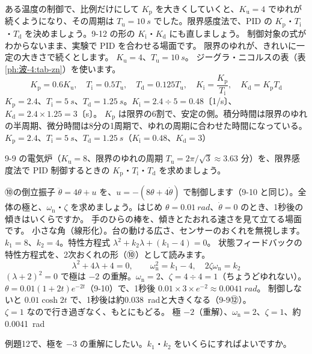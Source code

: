 \label{ph:波-4:ex11}
\begin{phreidai}
ある温度の制御で、比例だけにして $K_{\mathrm p}$ を大きくしていくと、$K_{\mathrm u}=4$ でゆれが続くようになり、その周期は $T_{\mathrm u}=\qty{10}{s}$ でした。限界感度法で、PID の $K_{\mathrm p}$・$T_{\mathrm i}$・$T_{\mathrm d}$ を決めましょう。9-12 の形の $K_{\mathrm i}$・$K_{\mathrm d}$ にも直しましょう。
\phbamen
制御対象の式がわからないまま、実験で PID を合わせる場面です。
\phmushi
限界のゆれが、きれいに一定の大きさで続くとします。
\phzu
$K_{\mathrm u}=4$、$T_{\mathrm u}=\qty{10}{s}$。
\phriyu
ジーグラ・ニコルスの表（表\ref{ph:波-4:tab-zn}）を使います。
\phtateru
\[K_{\mathrm p}=0.6K_{\mathrm u},\quad T_{\mathrm i}=0.5T_{\mathrm u},\quad T_{\mathrm d}=0.125T_{\mathrm u},\quad K_{\mathrm i}=\frac{K_{\mathrm p}}{T_{\mathrm i}},\quad K_{\mathrm d}=K_{\mathrm p}T_{\mathrm d}\]
\phtoku
$K_{\mathrm p}=2.4$、$T_{\mathrm i}=\qty{5}{s}$、$T_{\mathrm d}=\qty{1.25}{s}$。$K_{\mathrm i}=2.4\div5=0.48$〔1/s〕、$K_{\mathrm d}=2.4\times1.25=3$〔s〕。
\phtashikame
$K_{\mathrm p}$ は限界の6割で、安定の側。積分時間は限界のゆれの半周期、微分時間は8分の1周期で、ゆれの周期に合わせた時間になっている。
\kotae $K_{\mathrm p}=2.4$、$T_{\mathrm i}=\qty{5}{s}$、$T_{\mathrm d}=\qty{1.25}{s}$（$K_{\mathrm i}=0.48$、$K_{\mathrm d}=3$）
\end{phreidai}
\begin{jibun}
9-9 の電気炉（$K_{\mathrm u}=8$、限界のゆれの周期 $T_{\mathrm u}=2\pi/\sqrt3\approx3.63$ 分）を、限界感度法で PID 制御するときの $K_{\mathrm p}$・$T_{\mathrm i}$・$T_{\mathrm d}$ を求めましょう。
\end{jibun}

\label{ph:波-4:ex12}
\begin{phreidai}[倒立振子の状態フィードバック]
⑩の倒立振子 $\ddot\theta=4\theta+u$ を、$u=-(8\theta+4\dot\theta)$ で制御します（9-10 と同じ）。全体の極と、$\omega_{\mathrm n}$・$\zeta$ を求めましょう。はじめ $\theta=\qty{0.01}{rad}$、$\dot\theta=0$ のとき、1秒後の傾きはいくらですか。
\phbamen
手のひらの棒を、傾きとたおれる速さを見て立てる場面です。
\phmushi
小さな角（線形化）。台の動ける広さ、センサーのおくれを無視します。
\phzu
$k_1=8$、$k_2=4$。特性方程式 $\lambda^2+k_2\lambda+(k_1-4)=0$。
\phriyu
状態フィードバックの特性方程式を、2次おくれの形（⑩）として読みます。
\phtateru
\[\lambda^2+4\lambda+4=0,\qquad\omega_{\mathrm n}^2=k_1-4,\quad2\zeta\omega_{\mathrm n}=k_2\]
\phtoku
$(\lambda+2)^2=0$ で極は $-2$ の重解。$\omega_{\mathrm n}=2$、$\zeta=4\div4=1$（ちょうどゆれない）。$\theta=0.01(1+2t)e^{-2t}$（9-10）で、1秒後 $0.01\times3\times e^{-2}\approx\qty{0.0041}{rad}$。
\phtashikame
制御しないと $0.01\cosh2t$ で、1秒後は約\qty{0.038}{rad}と大きくなる（9-9⑫）。\\
$\zeta=1$ なので行き過ぎなく、もとにもどる。
\kotae 極 $-2$（重解）、$\omega_{\mathrm n}=2$、$\zeta=1$、約\qty{0.0041}{rad}
\end{phreidai}
\begin{jibun}
例題12で、極を $-3$ の重解にしたい。$k_1$・$k_2$ をいくらにすればよいですか。
\end{jibun}

